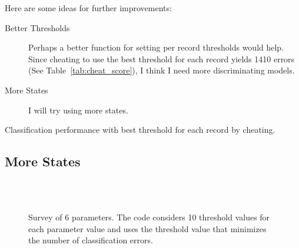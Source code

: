 \documentclass[12pt]{article}
\begin{document}


Here are some ideas for further improvements:
\begin{description}
\item[Better Thresholds] Perhaps a better function for setting per
  record thresholds would help.  Since cheating to use the best
  threshold for each record yields 1410 errors (See
  Table~\ref{tab:cheat_score}), I think I need more discriminating
  models.
\item[More States] I will try using more states.
\end{description}


\begin{table*}
  \centering
  
  \caption[Performance]{Classification performance with best threshold
  for each record by cheating.}
  \label{tab:cheat_score}
\end{table*}

\subsection{More States}
\label{sec:more_states}

\begin{figure}
  \centering
  \\
  \\
  \caption[Parameter sensitivity with variable thresholds.]{Survey of
    6 parameters.  The code considers 10 threshold values for each
    parameter value and uses the threshold value that minimizes the
    number of classification errors.}
  \label{fig:multi_cheat}
\end{figure}
\end{document}
